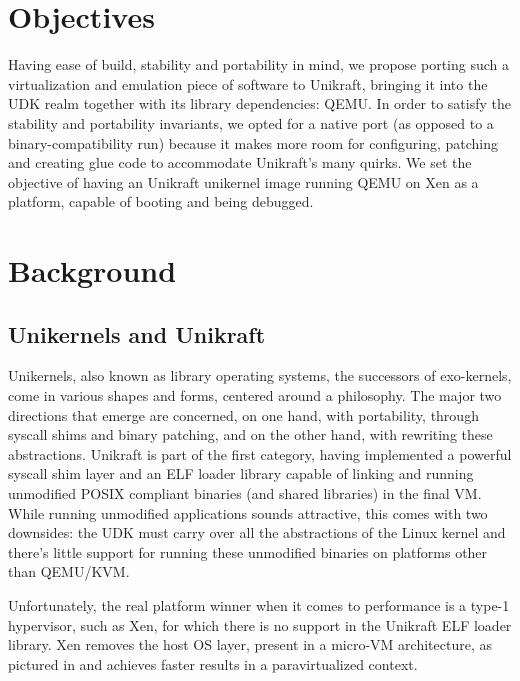 \section{Objectives}
\label{sec:objectives}

Having ease of build, stability and portability in mind, we propose porting such a virtualization and emulation piece of software to Unikraft, bringing it into the UDK realm together with its library dependencies: QEMU.
In order to satisfy the stability and portability invariants, we opted for a native port (as opposed to a binary-compatibility run) because it makes more room for configuring, patching and creating glue code to accommodate Unikraft's many quirks.
We set the objective of having an Unikraft unikernel image running QEMU on Xen as a platform, capable of booting and being debugged.

\section{Background}
\label{sec:background}

\subsection{Unikernels and Unikraft}
\label{subsec:unikernels-unikraft}

Unikernels, also known as library operating systems, the successors of exo-kernels, come in various shapes and forms, centered around a philosophy.
The major two directions that emerge are concerned, on one hand, with portability, through syscall shims and binary patching, and on the other hand, with rewriting these abstractions.
Unikraft is part of the first category, having implemented a powerful syscall shim layer and an ELF loader library \cite{app-elfloader} capable of linking and running unmodified POSIX compliant binaries (and shared libraries) in the final VM.
While running unmodified applications sounds attractive, this comes with two downsides: the UDK must carry over all the abstractions of the Linux kernel and there's little support for running these unmodified binaries on platforms other than QEMU/KVM.

Unfortunately, the real platform winner when it comes to performance is a type-1 hypervisor, such as Xen, for which there is no support in the Unikraft ELF loader library.
Xen removes the host OS layer, present in a micro-VM architecture, as pictured in  and achieves faster results in a paravirtualized context.

